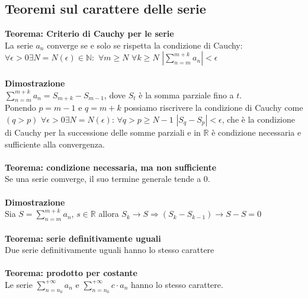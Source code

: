 \documentclass{article}
\begin{document}
\subsection{Teoremi sul carattere delle serie}
\textbf{Teorema: Criterio di Cauchy per le serie}\\
La serie $a_n$ converge se e solo se rispetta la condizione di Cauchy: $\forall\epsilon>0\exists N=N(\epsilon)\in\mathds{N}:$ $\forall m\geq N$ $\forall k\geq N$ $\left|\sum_{n=m}^{m+k}a_n\right|<\epsilon$\\\\
\textbf{Dimostrazione}\\
$\sum_{n=m}^{m+k}a_n=S_{m+k}-S_{m-1}$, dove $S_t$ è la somma parziale fino a $t$.\\
Ponendo $p=m-1$ e $q=m+k$ possiamo riscrivere la condizione di Cauchy come $(q>p)$ $\forall\epsilon>0 \exists N=N(\epsilon)$: $\forall q>p\geq N-1$ $|S_q-S_p|<\epsilon$, che è la condizione di Cauchy per la successione delle somme parziali e in $\mathds{R}$ è condizione necessaria e sufficiente alla convergenza.\\
\\
\textbf{Teorema: condizione necessaria, ma non sufficiente}\\
Se una serie comverge, il suo termine generale tende a 0.\\\\
\textbf{Dimostrazione}\\
Sia $S=\sum_{n=m}^{m+k}a_n$, $s\in\mathds{R}$ allora $S_k\rightarrow S\Rightarrow (S_k-S_{k-1})\rightarrow S-S=0$\\
\\
\textbf{Teorema: serie definitivamente uguali}\\
Due serie definitivamente uguali hanno lo stesso carattere\\\\
\textbf{Teorema: prodotto per costante}\\
Le serie $\sum_{n=n_0}^{+\infty}a_n$ e $\sum_{n=n_0}^{+\infty}c\cdot a_n$ hanno lo stesso carattere.
\end{document}
